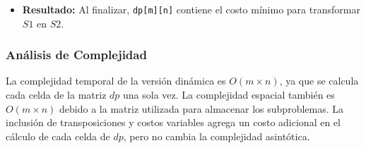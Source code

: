 \begin{itemize}
    \item \textbf{Resultado:} Al finalizar, \texttt{dp[m][n]} contiene el costo mínimo para transformar \( S1 \) en \( S2 \).
\end{itemize}

\subsubsection{Análisis de Complejidad}
La complejidad temporal de la versión dinámica es \( O(m \times n) \), ya que se calcula cada celda de la matriz \( dp \) una sola vez. La complejidad espacial también es \( O(m \times n) \) debido a la matriz utilizada para almacenar los subproblemas. La inclusión de transposiciones y costos variables agrega un costo adicional en el cálculo de cada celda de \( dp \), pero no cambia la complejidad asintótica.



